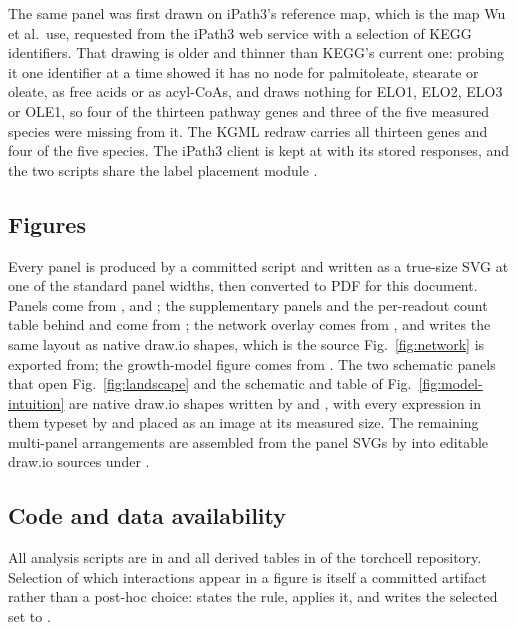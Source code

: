  The same panel was first drawn on iPath3's
reference map, which is the map Wu et al.\ use, requested from the iPath3 web service with
a selection of KEGG identifiers. That drawing is older and thinner than KEGG's current
one: probing it one identifier at a time showed it has no node for palmitoleate, stearate
or oleate, as free acids or as acyl-CoAs, and draws nothing for ELO1, ELO2, ELO3 or OLE1,
so four of the thirteen pathway genes and three of the five measured species were missing
from it. The KGML redraw carries all thirteen genes and four of the five species. The
iPath3 client is kept at  with its
stored responses, and the two scripts share the label placement module
.

\subsection*{Figures}

Every panel is produced by a committed script and written as a true-size SVG at one of the
standard panel widths, then converted to PDF for this document. Panels come from
,  and
; the supplementary panels and the per-readout count
table behind  and  come from
; the network overlay comes from
, and  writes the
same layout as native draw.io shapes, which is the source Fig.~\ref{fig:network} is exported
from; the growth-model figure comes from
. The two schematic
panels that open Fig.~\ref{fig:landscape} and the schematic and table of
Fig.~\ref{fig:model-intuition} are native draw.io shapes written by
 and ,
with every expression in them typeset by  and
placed as an image at its measured size. The remaining multi-panel arrangements are
assembled from the panel SVGs by  into editable draw.io
sources under .

\subsection*{Code and data availability}

All analysis scripts are in  and all derived tables
in  of the torchcell repository. Selection of which
interactions appear in a figure is itself a committed artifact rather than a post-hoc
choice:  states the rule, applies it, and writes the
selected set to .
